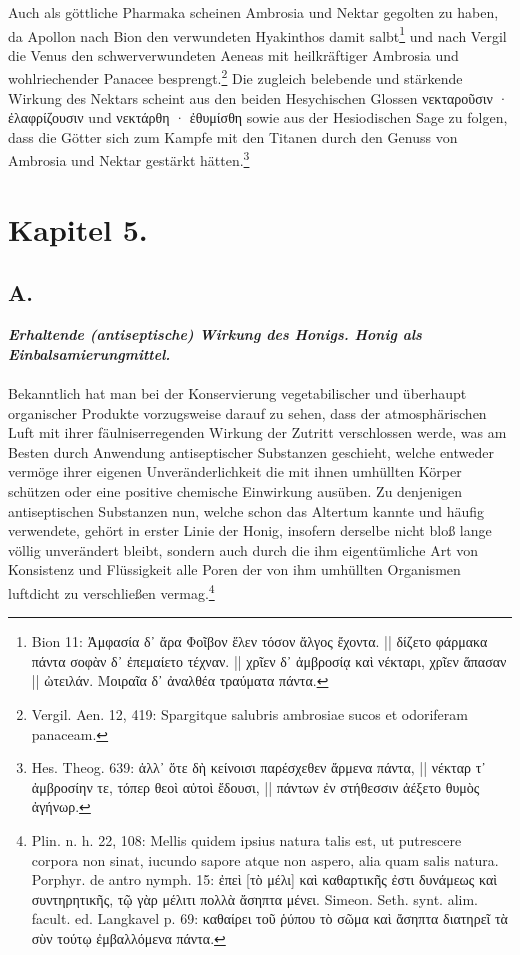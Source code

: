 \documentclass[a4paper, 11pt, oneside]{article}
\begin{document}
Auch als göttliche Pharmaka scheinen Ambrosia und Nektar gegolten zu haben, da Apollon nach Bion den verwundeten Hyakinthos damit salbt\footnote{Bion 11: Ἀμφασία δ᾽ ἄρα Φοῖβον ἕλεν τόσον ἄλγος ἔχοντα. || δίζετο φάρμακα πάντα σοφὰν δ᾽ ἐπεμαίετο τέχναν. || χρῖεν δ᾽ ἀμβροσίᾳ καὶ νέκταρι, χρῖεν ἅπασαν || ὠτειλάν. Μοιραῖα δ᾽ ἀναλθέα τραύματα πάντα.} und nach Vergil die Venus den schwerverwundeten Aeneas mit heilkräftiger Ambrosia und wohlriechender Panacee besprengt.\footnote{Vergil. Aen. 12, 419: Spargitque salubris ambrosiae sucos et odoriferam panaceam.} Die zugleich belebende und stärkende Wirkung des Nektars scheint aus den beiden Hesychischen Glossen νεκταροῦσιν · ἐλαφρίζουσιν und νεκτάρθη · ἐθυμίσθη sowie aus der Hesiodischen Sage zu folgen, dass die Götter sich zum Kampfe mit den Titanen durch den Genuss von Ambrosia und Nektar gestärkt hätten.\footnote{Hes. Theog. 639: ἀλλ᾽ ὅτε δὴ κείνοισι παρέσχεθεν ἄρμενα πάντα, || νέκταρ τ᾽ ἀμβροσίην τε, τόπερ θεοὶ αὐτοὶ ἔδουσι, || πάντων ἐν στήθεσσιν ἀέξετο θυμὸς ἀγήνωρ.}
\clearpage
\section{Kapitel 5.}
\subsection{A.}
\begin{center}
\textbf{\emph{Erhaltende (antiseptische) Wirkung des Honigs. Honig als Einbalsamierungmittel.}}
\end{center}
\paragraph{}
Bekanntlich hat man bei der Konservierung vegetabilischer und überhaupt organischer Produkte vorzugsweise darauf zu sehen, dass der atmosphärischen Luft mit ihrer fäulniserregenden Wirkung der Zutritt verschlossen werde, was am Besten durch Anwendung antiseptischer Substanzen geschieht, welche entweder vermöge ihrer eigenen Unveränderlichkeit die mit ihnen umhüllten Körper schützen oder eine positive chemische Einwirkung ausüben. Zu denjenigen antiseptischen Substanzen nun, welche schon das Altertum kannte und häufig verwendete, gehört in erster Linie der Honig, insofern derselbe nicht bloß lange völlig unverändert bleibt, sondern auch durch die ihm eigentümliche Art von Konsistenz und Flüssigkeit alle Poren der von ihm umhüllten Organismen luftdicht zu verschließen vermag.\footnote{Plin. n. h. 22, 108: Mellis quidem ipsius natura talis est, ut putrescere corpora non sinat, iucundo sapore atque non aspero, alia quam salis natura. Porphyr. de antro nymph. 15: ἐπεὶ [τὸ μέλι] καὶ καθαρτικῆς ἐστι δυνάμεως καὶ συντηρητικῆς, τῷ γὰρ μέλιτι πολλὰ ἄσηπτα μένει. Simeon. Seth. synt. alim. facult. ed. Langkavel p. 69: καθαίρει τοῦ ῥύπου τὸ σῶμα καὶ ἄσηπτα διατηρεῖ τὰ σὺν τούτῳ ἐμβαλλόμενα πάντα.}
\end{document}

